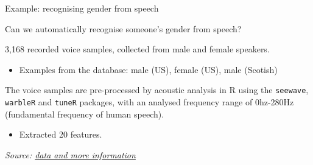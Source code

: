 \documentclass[compress]{beamer}
\newcommand{\source}[2]{{\tiny\it Source: \href{#1}{#2}}}
\begin{document}
\begin{frame}{Example: recognising gender from speech}

Can we automatically recognise someone's gender from speech?

3,168 recorded voice samples, collected from male and female speakers.

\begin{itemize}

\item Examples from the database: male (US), female (US), male (Scotish)
\end{itemize}

    \begin{center}
    \hspace{0.3em}
    \hspace{0.3em}
    \end{center}


The voice samples are pre-processed by acoustic analysis in R using the
{\tt seewave}, {\tt warbleR} and {\tt tuneR} packages, with an analysed frequency range of
0hz-280Hz (fundamental frequency of human speech).

\begin{itemize}

\item Extracted 20 features.
\end{itemize}

    \source{https://www.kaggle.com/primaryobjects/voicegender}{data and more information}


\end{frame}
\end{document}
